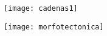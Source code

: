 \documentclass{beamer}
\begin{document}
\begin{frame}
\begin{center}
\begin{figure}
\texttt{[image: cadenas1]}
\end{figure}
\end{center}
\end{frame}
\begin{frame}
\begin{center}
\begin{figure}
\texttt{[image: morfotectonica]}
\end{figure}
\end{center}
\end{frame}
\end{document}

